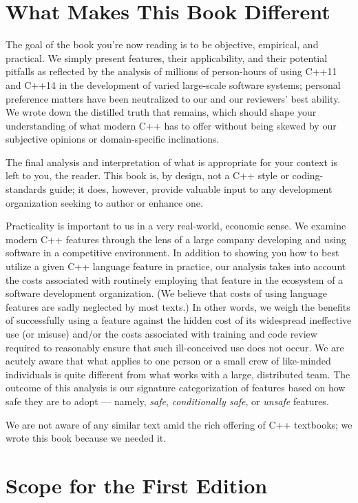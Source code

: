 \section{What Makes This Book Different}

The goal of the book you're now reading is to be objective, empirical, and practical. We simply present features, their applicability, and their potential pitfalls as reflected by the analysis of millions of person-hours of using C++11 and C++14 in the development of varied large-scale software systems; personal preference matters have been neutralized to our and our reviewers' best ability. We wrote down the distilled truth that remains, which should shape your understanding of what modern C++ has to offer without being skewed by our subjective opinions or domain-specific inclinations.

The final analysis and interpretation of what is appropriate for your context is left to you, the reader. This book is, by design, not a C++ style or coding-standards guide; it does, however, provide valuable input to any development organization seeking to author or enhance one.

Practicality is important to us in a very real-world, economic sense. We examine modern C++ features through the lens of a large company developing and using software in a competitive environment. In addition to showing you how to best utilize a given C++ language feature in practice, our analysis takes into account the costs associated with routinely employing that feature in the ecosystem of a software development organization. (We believe that costs of using language features are sadly neglected by most texts.) In other words, we weigh the benefits of successfully using a feature against the hidden cost of its widespread ineffective use (or misuse) and/or the costs associated with training and code review required to reasonably ensure that such ill-conceived use does not occur. We are acutely aware that what applies to one person or a small crew of like-minded individuals is quite different from what works with a large, distributed team. The outcome of this analysis is our signature categorization of features based on how safe they are to adopt --- namely, \emph{safe}, \emph{conditionally safe}, or \emph{unsafe} features.

We are not aware of any similar text amid the rich offering of C++ textbooks; we wrote this book because we needed it.

\section{Scope for the First Edition}

